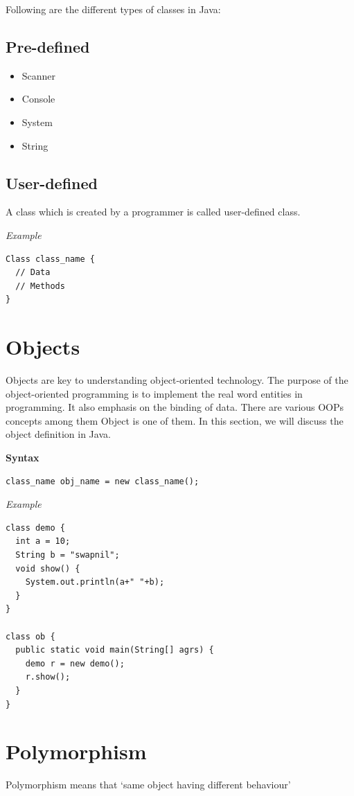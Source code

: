 \documentclass[twocolumn, a4paper]{article}
\begin{document}
Following are the different types of classes in Java:
\subsection{Pre-defined}
\begin{itemize}
  \item Scanner
  \item Console
  \item System
  \item String
\end{itemize}
\subsection{User-defined}
A class which is created by a programmer is called user-defined class.

\vskip10pt
\noindent\emph{Example}
\begin{lstlisting}
Class class_name {
  // Data
  // Methods
}
\end{lstlisting}

\section{Objects}
Objects are key to understanding object-oriented technology. The purpose of
the object-oriented programming is to implement the real word entities in
programming. It also emphasis on the binding of data. There are various OOPs
concepts among them Object is one of them. In this section, we will discuss
the object definition in Java.

\vskip10pt
\noindent\textbf{Syntax}
\begin{lstlisting}
class_name obj_name = new class_name();
\end{lstlisting}

\noindent\emph{Example}
\begin{lstlisting}
class demo {
  int a = 10;
  String b = "swapnil";
  void show() {
    System.out.println(a+" "+b);
  }
}

class ob {
  public static void main(String[] agrs) {
    demo r = new demo();
    r.show();
  }
}
\end{lstlisting}

\section{Polymorphism}
Polymorphism means that `same object having different behaviour'
\end{document}
